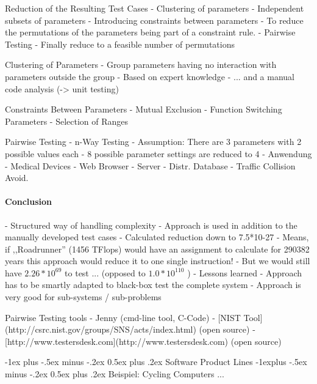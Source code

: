 \documentclass[a4paper]{article}
\makeatletter
\renewcommand{\section}{\@startsection{section}{1}{0mm}%
                                {-1ex plus -.5ex minus -.2ex}%
                                {0.5ex plus .2ex}%
                                {\normalfont\large\bfseries}}
\renewcommand{\subsection}{\@startsection{subsection}{2}{0mm}%
                                {-1explus -.5ex minus -.2ex}%
                                {0.5ex plus .2ex}%
                                {\normalfont\normalsize\bfseries}}
\makeatother
\begin{document}
\begin{multicols}{3}
  Reduction of the Resulting Test Cases
  - Clustering of parameters
      - Independent subsets of parameters
  - Introducing constraints between parameters
      - To reduce the permutations of the parameters being part of a constraint rule.
  - Pairwise Testing
      - Finally reduce to a feasible number of permutations
  
  Clustering of Parameters
  - Group parameters having no interaction with parameters outside the group
  - Based on expert knowledge
  - ... and a manual code analysis (-> unit testing)
  
  Constraints Between Parameters
  - Mutual Exclusion
  - Function Switching Parameters
  - Selection of Ranges
  
  Pairwise Testing
  - n-Way Testing
      - Assumption: There are 3 parameters with 2 possible values each
      - 8 possible parameter settings are reduced to 4
  - Anwendung
      - Medical Devices
      - Web Browser
      - Server
      - Distr. Database
      - Traffic Collision Avoid.
  
  \paragraph{Conclusion}
  - Structured way of handling complexity
  - Approach is used in addition to the manually developed test cases
  - Calculated reduction down to 7.5*10-27%
      - Means, if ,,Roadrunner'' (1456 TFlops) would have an assignment to calculate for 290382 years this approach would reduce it to one single instruction!
      - But we would still have $2.26*10^69$ to test ... (opposed to $1.0*10^110$ )
  - Lessons learned
      - Approach has to be smartly adapted to black-box test the complete system
      - Approach is very good for sub-systems / sub-problems
  
  
  Pairwise Testing tools
  - Jenny (cmd-line tool, C-Code)
  - [NIST Tool](http://csrc.nist.gov/groups/SNS/acts/index.html) (open source)
  - [http://www.testersdesk.com](http://www.testersdesk.com) (open source)
  
  
  \section{Software Product Lines}
  \subsection{Beispiel: Cycling Computers ...}
  

\end{multicols}
\end{document}
